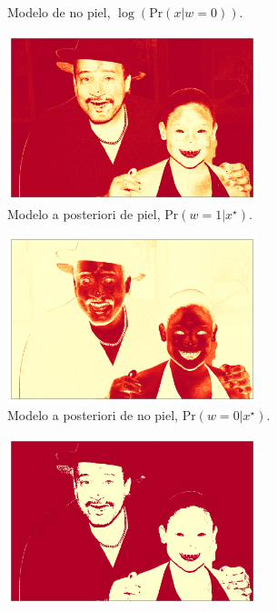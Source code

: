 \begin{figure}[ht!]
\begin{subfigure}{0.4\textwidth}
        \caption{Modelo de no piel, $\log(\text{Pr}(x | w=0))$.}
    \end{subfigure}
    \begin{subfigure}{0.4\textwidth}
        \centering
        \includegraphics[width=0.8\textwidth]{../figures/image3/image_03_postskin.png}
        \caption{Modelo a posteriori de piel, $\text{Pr}(w=1 | x^{\star})$.}
    \end{subfigure}
    \hspace{1cm}
    \begin{subfigure}{0.4\textwidth}
        \centering
        \includegraphics[width=0.8\textwidth]{../figures/image3/image_03_postbg.png}
        \caption{Modelo a posteriori de no piel, $\text{Pr}(w=0 | x^{\star})$.}
    \end{subfigure}
    \begin{subfigure}{0.4\textwidth}
        \centering
        \includegraphics[width=0.8\textwidth]{../figures/image3/image_03_treshskin_40percent.png}

\end{subfigure}
\end{figure}
